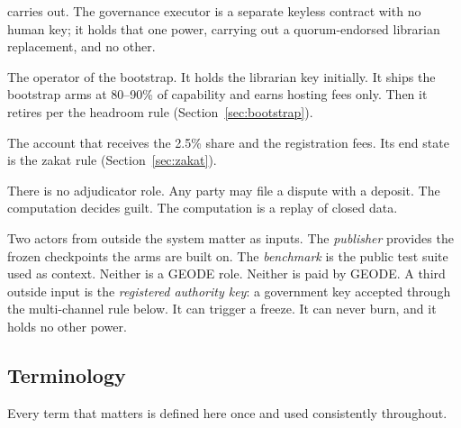 \documentclass[11pt]{article}
\begin{document}
\begin{description}
          carries out. The governance executor is a
          separate keyless contract with no human key; it holds that one
          power, carrying out a quorum-endorsed librarian replacement, and
          no other.
    \item[Developer.] The operator of the bootstrap. It holds the
          librarian key initially. It ships the bootstrap arms at 80--90\%
          of capability and earns hosting fees only. Then it retires per
          the headroom rule (Section~\ref{sec:bootstrap}).
    \item[Development fund.] The account that receives the 2.5\% share
          and the registration fees. Its end state is the zakat rule
          (Section~\ref{sec:zakat}).
\end{description}

There is no adjudicator role. Any party may file a dispute with a
deposit. The computation decides guilt. The computation is a
replay of closed data.

Two actors from outside the system matter as inputs. The
\emph{publisher} provides the frozen checkpoints the arms are
built on. The \emph{benchmark} is the public test suite used as
context. Neither is a GEODE role. Neither is paid by GEODE. A
third outside input is the \emph{registered authority key}: a
government key accepted through the multi-channel rule below. It
can trigger a freeze. It can never burn, and it holds no other
power.

\subsection{Terminology}\label{sec:terms}

Every term that matters is defined here once and used consistently
throughout.
\end{document}
